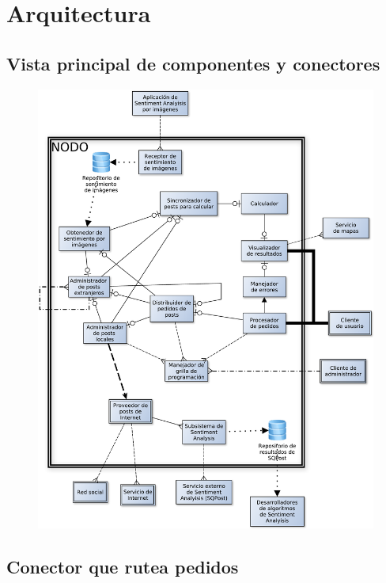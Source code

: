 
\section{Arquitectura}


\subsection{Vista principal de componentes y conectores}

\begin{figure}[H]
\centering
\includegraphics[width=\textwidth]{graph/main.pdf}
\end{figure}


\subsection{Conector que rutea pedidos}

